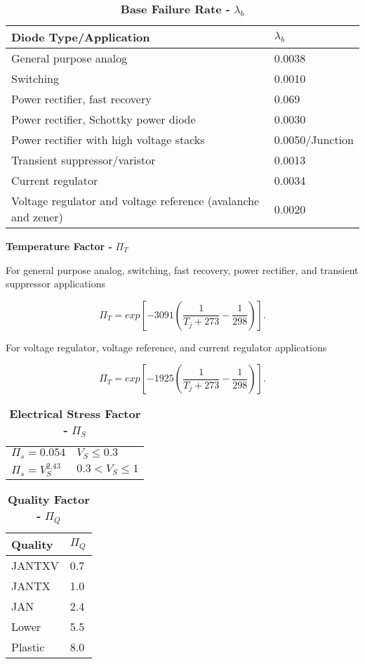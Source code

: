 \begin{table}
\caption{\textbf{Base Failure Rate -} $\lambda_{b}$}
\label{table:baseFailRateDiodeLow}
\begin{tabular}{|l|m{10cm}|} \hline
\textbf{Diode Type/Application} & $\lambda_{b}$ \\ \hline
General purpose analog & 0.0038 \\ \hline
Switching & 0.0010 \\ \hline
Power rectifier, fast recovery & 0.069 \\ \hline
Power rectifier, Schottky power diode & 0.0030 \\ \hline
Power rectifier with high voltage stacks & 0.0050/Junction \\ \hline
Transient suppressor/varistor & 0.0013 \\ \hline
Current regulator & 0.0034 \\ \hline
Voltage regulator and voltage reference (avalanche and zener) &
0.0020 \\ \hline
\end{tabular}
\end{table}

\textbf{Temperature Factor -} $\Pi_{T}$

For general purpose analog, switching, fast recovery, power rectifier,
and transient suppressor applications

$$\Pi_{T} = exp[-3091(\frac{1}{T_{j} + 273} - \frac{1}{298})].$$

For voltage regulator, voltage reference, and current regulator
applications

$$\Pi_{T} = exp[-1925(\frac{1}{T_{j} + 273} - \frac{1}{298})].$$


\begin{table}
\caption{\textbf{Electrical Stress Factor -} $\Pi_{S}$}
\label{table:electicalStressFactor}
\begin{tabular}{|l|l|}
$\Pi_s = 0.054$ 		& $V_{S} \leq 0.3$ \\ 
$\Pi_s = V^{2.43}_{S}$ & $0.3 < V_{S} \leq 1$ \\
\end{tabular}
\end{table}

\begin{table}
\caption{\textbf{Quality Factor -} $\Pi_{Q}$}
\label{table:qualityFactorDiode}
\begin{tabular}{|l|m{10cm}|} \hline
\textbf{Quality} & $\Pi_{Q}$ \\ \hline
JANTXV & 0.7 \\ \hline
JANTX & 1.0 \\ \hline
JAN & 2.4 \\ \hline
Lower & 5.5 \\ \hline
Plastic & 8.0 \\ \hline
\end{tabular}
\end{table}


